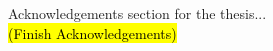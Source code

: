 \begin{acknowledgements}

        Acknowledgements section for the thesis...
        \\\hl{(Finish Acknowledgements)}

\end{acknowledgements}
